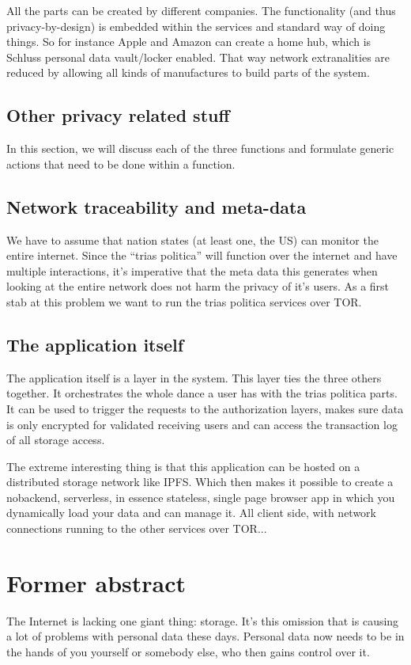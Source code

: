 \documentclass{article}
\begin{document}
All the parts can be created by different companies. The functionality (and thus privacy-by-design) is embedded within the services and standard way of doing things. So for instance Apple and Amazon can create a home hub, which is Schluss personal data vault/locker enabled. That way network extranalities are reduced by allowing all kinds of manufactures to build parts of the system.

\subsection{Other privacy related stuff}
In this section, we will discuss each of the three functions and formulate generic actions that need to be done within a function.

\subsection{Network traceability and meta-data }
We have to assume that nation states (at least one, the US) can monitor the entire internet. Since the ``trias politica'' will function over the internet and have multiple interactions, it's imperative that the meta data this generates when looking at the entire network does not harm the privacy of it's users. As a first stab at this problem we want to run the trias politica services over TOR.

\subsection{The application itself}
The application itself is a layer in the system. This layer ties the three others together. It orchestrates the whole dance a user has with the trias politica parts. It can be used to trigger the requests to the authorization layers, makes sure data is only encrypted for validated receiving users and can access the transaction log of all storage access.

The extreme interesting thing is that this application can be hosted on a distributed storage network like IPFS. Which then makes it possible to create a nobackend, serverless, in essence stateless, single page browser app in which you dynamically load your data and can manage it. All client side, with network connections running to the other services over TOR...

\section{Former abstract}
The Internet is lacking one giant thing: storage. It's this omission that is causing
a lot of problems with personal data these days. Personal data now needs to be in the hands of you yourself or somebody else, who then gains control over it.
\end{document}
